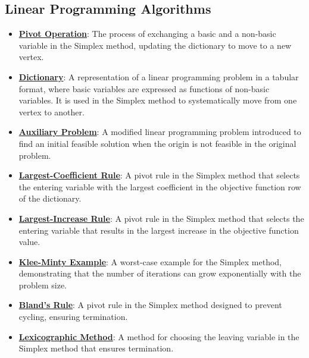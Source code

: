 \documentclass{article}%
\begin{document}
\subsection{Linear Programming Algorithms}%
\label{subsec:LinearProgrammingAlgorithms}%
\begin{itemize}[leftmargin=*]%
\item \href{https://www.math.purdue.edu/~yipn/421/2024-08-27-ExSimplex.pdf#page=9}{\textbf{Pivot Operation}}: The process of exchanging a basic and a non-basic variable in the Simplex method, updating the dictionary to move to a new vertex.%
\item \href{https://www.math.purdue.edu/~yipn/421/2024-08-27-ExSimplex.pdf#page=26}{\textbf{Dictionary}}: A representation of a linear programming problem in a tabular format, where basic variables are expressed as functions of non-basic variables. It is used in the Simplex method to systematically move from one vertex to another.%
\item \href{https://www.math.purdue.edu/~yipn/421/2024-08-27-ExSimplex.pdf#page=32}{\textbf{Auxiliary Problem}}: A modified linear programming problem introduced to find an initial feasible solution when the origin is not feasible in the original problem.%
\item \href{https://www.math.purdue.edu/~yipn/421/2024-09-05-SimplexEfficiency.pdf#page=4}{\textbf{Largest-Coefficient Rule}}: A pivot rule in the Simplex method that selects the entering variable with the largest coefficient in the objective function row of the dictionary.%
\item \href{https://www.math.purdue.edu/~yipn/421/2024-09-05-SimplexEfficiency.pdf#page=6}{\textbf{Largest-Increase Rule}}: A pivot rule in the Simplex method that selects the entering variable that results in the largest increase in the objective function value.%
\item \href{https://www.math.purdue.edu/~yipn/421/2024-09-05-SimplexEfficiency.pdf#page=2}{\textbf{Klee-Minty Example}}: A worst-case example for the Simplex method, demonstrating that the number of iterations can grow exponentially with the problem size.%
\item \href{https://www.math.purdue.edu/~yipn/421/2024-09-05-SimplexEfficiency.pdf#page=10}{\textbf{Bland's Rule}}: A pivot rule in the Simplex method designed to prevent cycling, ensuring termination.%
\item \href{https://www.math.purdue.edu/~yipn/421/2024-09-05-SimplexEfficiency.pdf#page=10}{\textbf{Lexicographic Method}}: A method for choosing the leaving variable in the Simplex method that ensures termination.%

\end{itemize}
\end{document}
